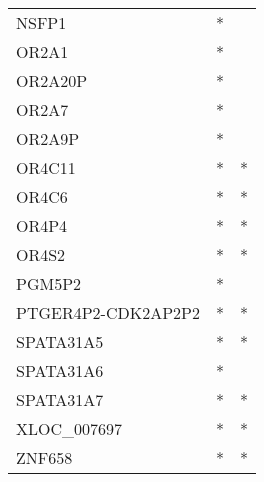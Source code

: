 \begin{tabular}{lcc}
NSFP1              &         * &         \\
OR2A1              &         * &         \\
OR2A20P            &         * &         \\
OR2A7              &         * &         \\
OR2A9P             &         * &         \\
OR4C11             &         * &       * \\
OR4C6              &         * &       * \\
OR4P4              &         * &       * \\
OR4S2              &         * &       * \\
PGM5P2             &         * &         \\
PTGER4P2-CDK2AP2P2 &         * &       * \\
SPATA31A5          &         * &       * \\
SPATA31A6          &         * &         \\
SPATA31A7          &         * &       * \\
XLOC\_007697        &         * &       * \\
ZNF658             &         * &       * \\
\bottomrule
\end{tabular}
